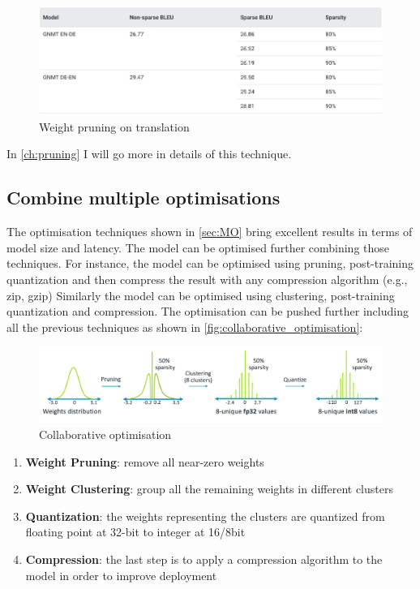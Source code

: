 \begin{figure}[ht]
    \includegraphics[width=\textwidth]{images/introduction/pruning_translation.png}
    \centering
    \caption{Weight pruning on translation}\label{fig:pruning_translation}
\end{figure}

In \autoref{ch:pruning} I will go more in details of this technique.

\subsection{Combine multiple optimisations}
The optimisation techniques shown in \autoref{sec:MO} bring excellent results
in terms of model size and latency.
The model can be optimised further combining those techniques. For instance,
the model can be optimised using pruning, post-training quantization and then
compress the result with any compression algorithm (e.g., zip, gzip)
Similarly the model can be optimised using clustering, post-training
quantization and compression.
The optimisation can be pushed further including all the previous techniques as
shown in \autoref{fig:collaborative_optimisation}:

\begin{figure}[ht]
    \includegraphics[width=\textwidth]{images/introduction/collaborative_optimisation.png}
    \centering
    \caption{Collaborative optimisation}\label{fig:collaborative_optimisation}
\end{figure}

\begin{enumerate}
    \item \textbf{Weight Pruning}: remove all near-zero weights
    \item \textbf{Weight Clustering}: group all the remaining weights in
        different clusters
    \item \textbf{Quantization}: the weights representing the clusters are
        quantized from floating point at 32-bit to integer at 16/8bit
    \item \textbf{Compression}: the last step is to apply a compression
        algorithm to the model in order to improve deployment
\end{enumerate}

